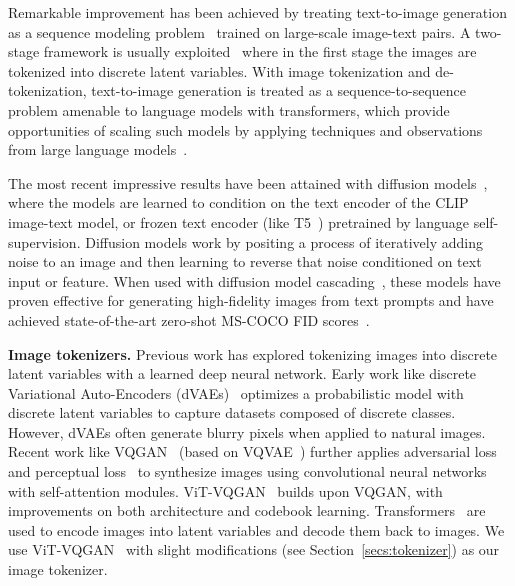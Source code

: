 Remarkable improvement has been achieved by treating text-to-image generation as a sequence modeling problem~\cite{Esser21vqgan, ding2021cogview, ramesh2021zero, gafni2022make, dallemini} trained on large-scale image-text pairs. A two-stage framework is usually exploited~\cite{yu2021vector, chang2022maskgit} where in the first stage the images are tokenized into discrete latent variables. With image tokenization and de-tokenization, text-to-image generation is treated as a sequence-to-sequence problem amenable to language models with transformers, which provide opportunities of scaling such models by applying techniques and observations from large language models~\cite{radford2018improving, du2021glam, chowdhery2022palm, hoffmann2022training}.

The most recent impressive results have been attained with diffusion models~\cite{nichol2021glide, ramesh2022hierarchical, imagen}, where the models are learned to condition on the text encoder of the CLIP~\cite{radford2021learning} image-text model, or frozen text encoder (like T5~\cite{raffel2019exploring}) pretrained by language self-supervision. Diffusion models work by positing a process of iteratively adding noise to an image and then learning to reverse that noise conditioned on text input or feature. When used with diffusion model cascading~\cite{ho2022cascaded}, these models have proven effective for generating high-fidelity images from text prompts and have achieved state-of-the-art zero-shot MS-COCO FID scores~\cite{imagen}.

\textbf{Image tokenizers.} Previous work has explored tokenizing images into discrete latent variables with a learned deep neural network. Early work like discrete Variational Auto-Encoders (dVAEs)~\cite{rolfe2016discrete} optimizes a probabilistic model with discrete latent variables to capture datasets composed of discrete classes. However, dVAEs often generate blurry pixels when applied to natural images. Recent work like VQGAN~\citep{Esser21vqgan} (based on VQVAE~\cite{van2017neural}) further applies adversarial loss~\cite{karras2020analyzing} and perceptual loss~\citep{johnson2016perceptual, zhang2018unreasonable} to synthesize images using convolutional neural networks with self-attention modules. ViT-VQGAN~\cite{yu2021vector} builds upon VQGAN, with improvements on both architecture and codebook learning. Transformers~\cite{vaswani2017attention} are used to encode images into latent variables and decode them back to images. We use ViT-VQGAN~\cite{yu2021vector} with slight modifications (see Section~\ref{secs:tokenizer}) as our image tokenizer.

